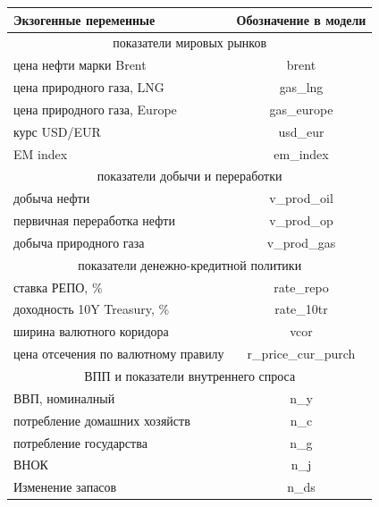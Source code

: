 \documentclass[a4paper, 14pt]{extarticle}
\begin{document}
\begin{center}
	\small
	\begin{tabular}{ l | c }
		\toprule
		Экзогенные переменные  &  Обозначение в модели  \\
		\midrule
		\multicolumn{2}{c}{показатели мировых рынков}\\
		\midrule
		цена нефти марки Brent & brent \\
		цена природного газа, LNG & gas\_lng \\
		цена природного газа, Europe & gas\_europe \\
		курс USD/EUR & usd\_eur \\
		EM index & em\_index \\
		\midrule
		\multicolumn{2}{c}{показатели добычи и переработки}\\
		\midrule
		добыча нефти & v\_prod\_oil \\
		первичная переработка нефти & v\_prod\_op \\
		добыча природного газа & v\_prod\_gas \\
		\midrule
		\multicolumn{2}{c}{показатели денежно-кредитной политики}\\
		\midrule
		ставка РЕПО, \% & rate\_repo \\ 
		доходность 10Y Treasury, \% & rate\_10tr \\
		ширина валютного коридора & vcor \\		
		цена отсечения по валютному правилу & r\_price\_cur\_purch\\
		\midrule	
		\multicolumn{2}{c}{ВПП и показатели внутреннего спроса}\\
		\midrule
		ВВП, номиналный & n\_y \\ 
		потребление домашних хозяйств & n\_c \\ 
		потребление государства & n\_g \\
		ВНОК & n\_j  \\ 
		Изменение запасов & n\_ds \\
		\bottomrule			
	\end{tabular}
	\label{tab:3} 
	\normalsize
\end{center}

\newpage
\end{document}
